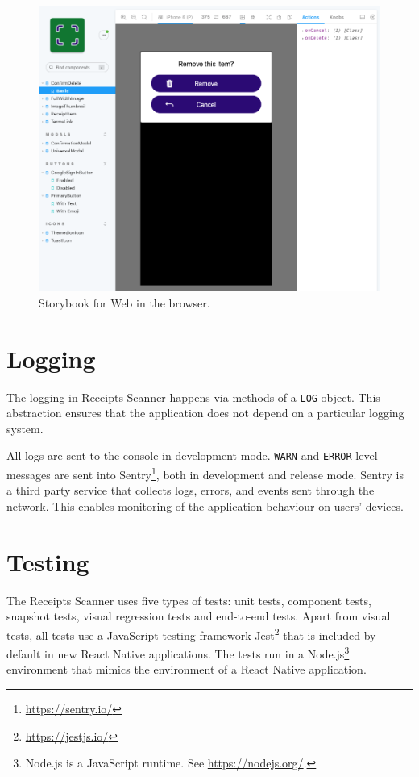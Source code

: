 \documentclass[
  digital, %
  table,   %
  oneside, %
  lof,     %
  lot,     %
]{fithesis3}
\begin{document}
\begin{figure}
    \begin{center}
        \includegraphics[width=\textwidth]{figures/other/storybook_web}
    \end{center}
    \caption{Storybook for Web in the browser.}
    \label{fig:storybook_web}
\end{figure}

\section{Logging}
The logging in Receipts Scanner happens via methods of a \texttt{LOG} object. This abstraction ensures that the application does not depend on a particular logging system.

All logs are sent to the console in development mode. \texttt{WARN} and \texttt{ERROR} level messages are sent into Sentry\footnote{\url{https://sentry.io/}}, both in development and release mode. Sentry is a third party service that collects logs, errors, and events sent through the network. This enables monitoring of the application behaviour on users' devices.

\section{Testing}
The Receipts Scanner uses five types of tests: unit tests, component tests, snapshot tests, visual regression tests and end-to-end tests.
Apart from visual tests, all tests use a JavaScript testing framework Jest\footnote{\url{https://jestjs.io/}} that is included by default in new React Native applications. The tests run in a Node.js\footnote{Node.js is a JavaScript runtime. See \url{https://nodejs.org/}.} environment that mimics the environment of a React Native application.
\end{document}
